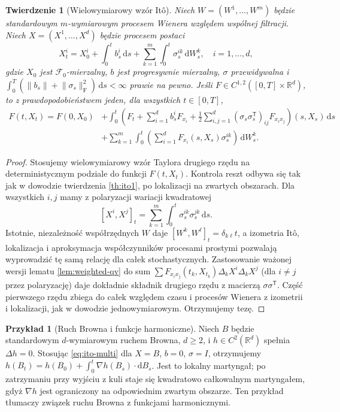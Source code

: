 \documentclass[11pt,a4paper,oneside]{report}
\numberwithin{equation}{chapter}
\theoremstyle{plain}
\newtheorem{twierdzenie}{Twierdzenie}[chapter]
\theoremstyle{definition}
\newtheorem{przyklad}{Przykład}[chapter]
\theoremstyle{remark}
\newcommand{\R}{\mathbb{R}}
\newcommand{\calF}{\mathcal{F}}
\newcommand{\dd}{\mathrm{d}}
\newcommand{\norm}[1]{\lVert #1\rVert}
\begin{document}
\begin{twierdzenie}[Wielowymiarowy wzór Itô]
\label{th:ito-multi}
Niech $W=(W^1,\ldots,W^m)$ będzie standardowym
$m$-wymiarowym procesem Wienera względem wspólnej
filtracji. Niech $X=(X^1,\ldots,X^d)$ będzie procesem
postaci
\[
X_t^i=X_0^i+\int_0^t b_s^i\,\dd s
+\sum_{k=1}^{m}\int_0^t\sigma_s^{ik}\,\dd W_s^k,
\quad i=1,\ldots,d,
\]
gdzie $X_0$ jest $\calF_0$-mierzalny, $b$ jest
progresywnie mierzalny, $\sigma$ przewidywalna i
$\int_0^T(\norm{b_s}+\norm{\sigma_s}_{\mathrm F}^2)\,\dd s
<\infty$ prawie na pewno. Jeśli
$F\in C^{1,2}([0,T]\times\R^d)$, to z prawdopodobieństwem
jeden, dla wszystkich $t\in[0,T]$,
\[
\begin{split}
F(t,X_t)=F(0,X_0)&+\int_0^t\left(
F_t+\sum_{i=1}^d b_s^iF_{x_i}
+\frac12\sum_{i,j=1}^d(\sigma_s\sigma_s^{\mathsf T})_{ij}
F_{x_ix_j}\right)(s,X_s)\,\dd s\\
&+\sum_{k=1}^m\int_0^t
\left(\sum_{i=1}^dF_{x_i}(s,X_s)\sigma_s^{ik}\right)
\,\dd W_s^k.
\end{split}
\tag{3.6}\label{eq:ito-multi}
\]
\end{twierdzenie}
\begin{proof}
Stosujemy wielowymiarowy wzór Taylora drugiego rzędu
na deterministycznym podziale do funkcji $F(t,X_t)$.
Kontrola reszt odbywa się tak jak w dowodzie twierdzenia
\ref{th:ito1}, po lokalizacji na zwartych obszarach.
Dla wszystkich $i,j$ mamy z polaryzacji wariacji
kwadratowej
\[
[X^i,X^j]_t
=\sum_{k=1}^m\int_0^t\sigma_s^{ik}\sigma_s^{jk}\,\dd s.
\]
Istotnie, niezależność współrzędnych $W$ daje
$[W^k,W^\ell]_t=\delta_{k\ell}t$, a izometria Itô,
lokalizacja i aproksymacja współczynników procesami
prostymi pozwalają wyprowadzić tę samą relację dla
całek stochastycznych. Zastosowanie ważonej wersji
lematu \ref{lem:weighted-qv} do sum
$\sum F_{x_ix_j}(t_k,X_{t_k})\Delta_kX^i\Delta_kX^j$
(dla $i\ne j$ przez polaryzację) daje dokładnie
składnik drugiego rzędu z macierzą $\sigma\sigma^{\mathsf T}$.
Część pierwszego rzędu zbiega do całek względem czasu
i procesów Wienera z izometrii i lokalizacji, jak w
dowodzie jednowymiarowym. Otrzymujemy tezę.
\end{proof}

\begin{przyklad}[Ruch Browna i funkcje harmoniczne]
Niech $B$ będzie standardowym $d$-wymiarowym ruchem
Browna, $d\ge2$, i $h\in C^2(\R^d)$ spełnia
$\Delta h=0$. Stosując \eqref{eq:ito-multi} dla
$X=B$, $b=0$, $\sigma=I$, otrzymujemy
$h(B_t)=h(B_0)+\int_0^t\nabla h(B_s)\cdot\dd B_s$.
Jest to lokalny martyngał; po zatrzymaniu przy wyjściu
z kuli staje się kwadratowo całkowalnym martyngałem,
gdyż $\nabla h$ jest ograniczony na odpowiednim
zwartym obszarze. Ten przykład tłumaczy związek
ruchu Browna z funkcjami harmonicznymi.
\end{przyklad}
\end{document}
